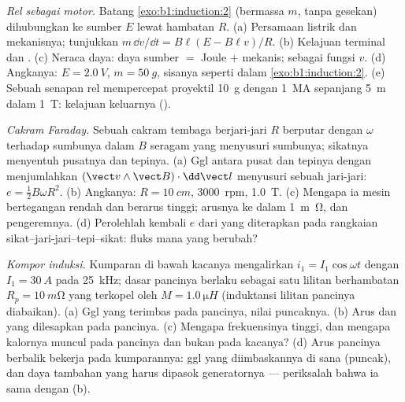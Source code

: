 \begin{exercise}[$\star\star\star$]\label{exo:b1:induction:10}
\emph{Rel sebagai motor.} Batang \cref{exo:b1:induction:2} (bermassa $m$,
tanpa gesekan) dihubungkan ke sumber $E$ lewat hambatan $R$.
(a) Persamaan listrik dan mekanisnya; tunjukkan $m\,\dd v/\dd t = B\ell(E -
B\ell v)/R$. (b) Kelajuan terminal dan . (c) Neraca daya:
daya sumber $=$ Joule $+$ mekanis;  sebagai fungsi
$v$. (d) Angkanya: $E = \qty{2.0}{V}$, $m = \qty{50}{g}$, sisanya seperti dalam
\cref{exo:b1:induction:2}. (e) Sebuah senapan rel mempercepat proyektil
\qty{10}{g} dengan \qty{1}{MA} sepanjang \qty{5}{m} dalam \qty{1}{T}: kelajuan keluarnya
().
\end{exercise}

\begin{exercise}[$\star\star\star$]\label{exo:b1:induction:11}
\emph{Cakram Faraday.} Sebuah cakram tembaga berjari-jari $R$ berputar dengan $\omega$
terhadap sumbunya dalam $B$ seragam yang menyusuri sumbunya; sikatnya menyentuh pusatnya
dan tepinya. (a) Ggl antara pusat dan tepinya dengan menjumlahkan $(\vect v\wedge
\vect B)\cdot\dd\vect l$ menyusuri sebuah jari-jari: $e = \tfrac12B\omega R^2$. (b) Angkanya:
$R = \qty{10}{cm}$, \qty{3000}{rpm}, \qty{1.0}{T}. (c) Mengapa ia mesin
bertegangan rendah dan berarus tinggi; arusnya ke dalam \qty{1}{m\ohm}, dan
 pengeremnya. (d) Perolehlah kembali $e$ dari  yang diterapkan pada
rangkaian sikat--jari-jari--tepi--sikat: fluks mana yang berubah?
\end{exercise}

\begin{exercise}[$\star\star\star$]\label{exo:b1:induction:12}
\emph{Kompor induksi.} Kumparan di bawah kacanya mengalirkan $i_1 =
I_1\cos\omega t$ dengan $I_1 = \qty{30}{A}$ pada \qty{25}{kHz}; dasar pancinya
berlaku sebagai satu lilitan berhambatan $R_p = \qty{10}{m\ohm}$ yang terkopel oleh
$M = \qty{1.0}{\micro H}$ (induktansi lilitan pancinya diabaikan). (a) Ggl
yang terimbas pada pancinya, nilai puncaknya. (b) Arus dan  yang dilesapkan
pada pancinya. (c) Mengapa frekuensinya tinggi, dan mengapa kalornya muncul pada
pancinya dan bukan pada kacanya? (d) Arus pancinya berbalik bekerja pada kumparannya:
ggl yang diimbaskannya di sana (puncak), dan daya tambahan yang harus dipasok
generatornya --- periksalah bahwa ia sama dengan (b).
\end{exercise}

